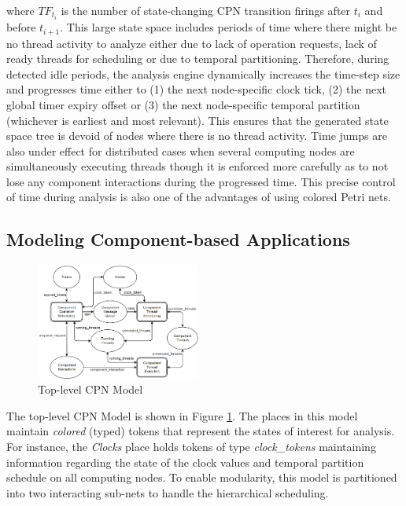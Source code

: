 where $TF_{t_i}$ is the number of state-changing CPN transition firings after $t_i$ and before $t_{i+1}$. This large state space includes periods of time where there might be no thread activity to analyze either due to lack of operation requests, lack of ready threads for scheduling or due to temporal partitioning. Therefore, during detected idle periods, the analysis engine dynamically increases the time-step size and progresses time either to (1) the next node-specific clock tick, (2) the next global timer expiry offset or (3) the next node-specific temporal partition (whichever is earliest and most relevant). This ensures that the generated state space tree is devoid of nodes where there is no thread activity. Time jumps are also under effect for distributed cases when several computing nodes are simultaneously executing threads though it is enforced more carefully as to not lose any component interactions during the progressed time. This precise control of time during analysis is also one of the advantages of using colored Petri nets. 

\subsection{Modeling Component-based Applications}

\begin{figure}[htb]
	\centering
	\includegraphics[width=0.48\textwidth]{figs/HL_CPN.png}
	\caption{Top-level CPN Model}
	\label{fig:hl_cpn}
\end{figure}

The top-level CPN Model is shown in Figure \ref{fig:hl_cpn}. The places in this model maintain \emph{colored} (typed) tokens that represent the states of interest for analysis. For instance, the \emph{Clocks} place holds tokens of type \emph{clock\_tokens} maintaining information regarding the state of the clock values and temporal partition schedule on all computing nodes. To enable modularity, this model is partitioned into two interacting sub-nets to handle the hierarchical scheduling.

